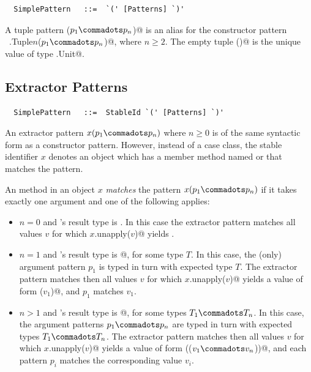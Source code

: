 \syntax\begin{lstlisting}
  SimplePattern   ::=  `(' [Patterns] `)'
\end{lstlisting}

A tuple pattern \lstinline@($p_1 \commadots p_n$)@ is an alias
for the constructor pattern ~\lstinline@scala.Tuple$n$($p_1 \commadots
p_n$)@, where $n \geq 2$. The empty tuple
\lstinline@()@ is the unique value of type \lstinline@scala.Unit@.

\subsection{Extractor Patterns}\label{sec:extractor-patterns}

\syntax\begin{lstlisting}
  SimplePattern   ::=  StableId `(' [Patterns] `)'
\end{lstlisting}

An extractor pattern $x(p_1 \commadots p_n)$ where $n \geq 0$ is of
the same syntactic form as a constructor pattern. However, instead of
a case class, the stable identifier $x$ denotes an object which has a
member method named  or  that matches
the pattern.

An  method in an object $x$ {\em matches} the pattern
$x(p_1 \commadots p_n)$ if it takes exactly one argument and one of
the following applies:
\begin{itemize}
\item[]
$n=0$ and 's result type is . In this case
the extractor pattern matches all values $v$ for which 
\lstinline@$x$.unapply($v$)@ yields .
\item[]
$n=1$ and 's result type is \lstinline@Option[$T$]@, for some
type $T$.  In this case, the (only) argument pattern $p_1$ is typed in
turn with expected type $T$.  The extractor pattern matches then all
values $v$ for which \lstinline@$x$.unapply($v$)@ yields a value of form
\lstinline@Some($v_1$)@, and $p_1$ matches $v_1$.
\item[]
$n>1$ and 's result type is 
\lstinline@Option[($T_1 \commadots T_n$)]@, for some
types $T_1 \commadots T_n$.  In this case, the argument patterns $p_1
\commadots p_n$ are typed in turn with expected types $T_1 \commadots
T_n$.  The extractor pattern matches then all values $v$ for which
\lstinline@$x$.unapply($v$)@ yields a value of form
\lstinline@Some(($v_1 \commadots v_n$))@, and each pattern
$p_i$ matches the corresponding value $v_i$.
\end{itemize}

